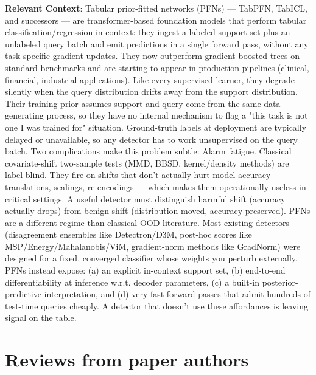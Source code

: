 \textbf{Relevant Context}: Tabular prior-fitted networks (PFNs) — TabPFN, TabICL, and successors — are transformer-based foundation models that perform tabular classification/regression in-context: they ingest a labeled support set plus an unlabeled query batch and emit predictions in a single forward pass, without any task-specific gradient updates. They now outperform gradient-boosted trees on standard benchmarks and are starting to appear in production pipelines (clinical, financial, industrial applications). Like every supervised learner, they degrade silently when the query distribution drifts away from the support distribution. Their training prior assumes support and query come from the same data-generating process, so they have no internal mechanism to flag a "this task is not one I was trained for" situation. Ground-truth labels at deployment are typically delayed or unavailable, so any detector has to work unsupervised on the query batch. Two complications make this problem subtle: Alarm fatigue. Classical covariate-shift two-sample tests (MMD, BBSD, kernel/density methods) are label-blind. They fire on shifts that don't actually hurt model accuracy — translations, scalings, re-encodings — which makes them operationally useless in critical settings. A useful detector must distinguish harmful shift (accuracy actually drops) from benign shift (distribution moved, accuracy preserved). PFNs are a different regime than classical OOD literature. Most existing detectors (disagreement ensembles like Detectron/D3M, post-hoc scores like MSP/Energy/Mahalanobis/ViM, gradient-norm methods like GradNorm) were designed for a fixed, converged classifier whose weights you perturb externally. PFNs instead expose: (a) an explicit in-context support set, (b) end-to-end differentiability at inference w.r.t. decoder parameters, (c) a built-in posterior-predictive interpretation, and (d) very fast forward passes that admit hundreds of test-time queries cheaply. A detector that doesn't use these affordances is leaving signal on the table.



\section{Reviews from paper authors}

